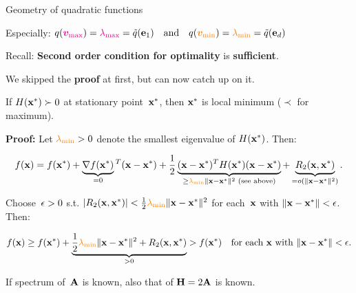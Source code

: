 \documentclass[11pt,compress,t,notes=noshow, xcolor=table]{beamer}
\begin{document}
\begin{vbframe}{Geometry of quadratic functions}
\begin{itemize}
\begin{footnotesize}
            Especially: $q(\textcolor{magenta}{\bm{v}_\text{max}}) = \textcolor{magenta}{\lambda_\text{max}} = \tilde{q}(\mathbf{e}_1) \quad\text{and}\quad q(\textcolor{orange}{\bm{v}_\text{min}}) = \textcolor{orange}{\lambda_\text{min}} = \tilde{q}(\mathbf{e}_d)$
        \end{footnotesize}
\end{itemize}

Recall: \textbf{Second order condition for optimality} is \textbf{sufficient}.

\medskip

We skipped the \textbf{proof} at first, but can now catch up on it.


    \footnotesize
     If $H(\mathbf{x}^\ast) \succ 0$ at stationary point~$\mathbf{x}^\ast$, then $\mathbf{x}^\ast$ is local minimum ($\prec$ for maximum).

     \medskip

    \textbf{Proof:}
    Let $\textcolor{orange}{\lambda_\text{min}}>0$ denote the smallest eigenvalue of $H(\mathbf{x}^\ast)$.
    Then:
    
    \vspace{-1.25\baselineskip}
    
    \begin{equation*}
        f(\mathbf{x}) = f(\mathbf{x}^\ast) + \underbrace{\nabla f(\mathbf{x}^\ast)}_{=0}{}^T(\mathbf{x}-\mathbf{x}^\ast) + \frac{1}{2}\underbrace{(\mathbf{x}-\mathbf{x}^\ast)^T H(\mathbf{x}^\ast)(\mathbf{x}-\mathbf{x}^\ast)}_{\geq \textcolor{orange}{\lambda_\text{min}} \|\mathbf{x}-\mathbf{x}^\ast\|^2 \text{ (see above)}} + \underbrace{R_2(\mathbf{x},\mathbf{x}^\ast)}_{=o(\|\mathbf{x}-\mathbf{x}^\ast\|^2)}.
    \end{equation*}

    Choose~$\epsilon>0$ s.t. $|R_2(\mathbf{x},\mathbf{x}^\ast)| < \frac{1}{2} \textcolor{orange}{\lambda_\text{min}} \|\mathbf{x}-\mathbf{x}^\ast\|^2$ for each~$\mathbf{x}$ with $\|\mathbf{x}-\mathbf{x}^\ast\|<\epsilon$.
    Then:

    \vspace{-1.25\baselineskip}

    \begin{equation*}
        f(\mathbf{x}) \geq f(\mathbf{x}^\ast) + \underbrace{\frac{1}{2} \textcolor{orange}{\lambda_\text{min}} \|\mathbf{x}-\mathbf{x}^\ast\|^2 + R_2(\mathbf{x},\mathbf{x}^\ast)}_{>0} > f(\mathbf{x}^\ast) \quad\text{for each $\mathbf{x}$ with $\|\mathbf{x}-\mathbf{x}^\ast\|<\epsilon$}.
    \end{equation*}


\framebreak

If spectrum of~$\mathbf{A}$ is known, also that of $\mathbf{H} = 2\mathbf{A}$ is known.


\end{vbframe}
\end{document}
